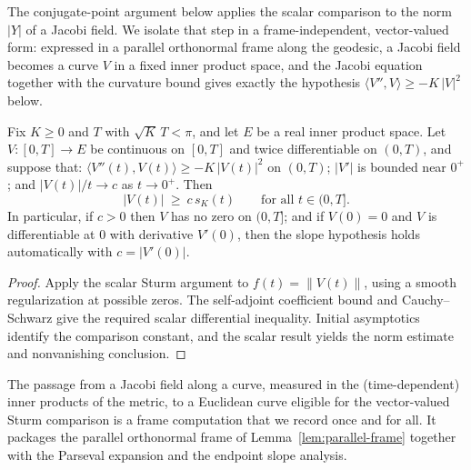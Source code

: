 The conjugate-point argument below applies the scalar comparison to
the norm $|Y|$ of a Jacobi field. We isolate that step in a
frame-independent, vector-valued form: expressed in a parallel
orthonormal frame along the geodesic, a Jacobi field becomes a curve
$V$ in a fixed inner product space, and the Jacobi equation together
with the curvature bound gives exactly the hypothesis
$\langle V'',V\rangle\ge-K\,|V|^2$ below.

\begin{lemma}
\label{lem:vector-sturm-comparison}





Fix $K\ge0$ and $T$ with $\sqrt K\,T<\pi$, and let $E$ be a real
inner product space. Let $V\colon[0,T]\to E$ be continuous on
$[0,T]$ and twice differentiable on $(0,T)$, and suppose that:
$\langle V''(t),V(t)\rangle\ge-K\,|V(t)|^2$ on $(0,T)$; $|V'|$ is
bounded near $0^+$; and $|V(t)|/t\to c$ as $t\to0^+$. Then
$$|V(t)|\ \ge\ c\,s_K(t)\qquad\text{for all }t\in(0,T].$$
In particular, if $c>0$ then $V$ has no zero on $(0,T]$; and if
$V(0)=0$ and $V$ is differentiable at $0$ with derivative $V'(0)$,
then the slope hypothesis holds automatically with $c=|V'(0)|$.
\end{lemma}

\begin{proof}
\sketch
{}

Apply the scalar Sturm argument to $f(t)=\|V(t)\|$, using a smooth regularization at possible zeros. The self-adjoint coefficient bound and Cauchy--Schwarz give the required scalar differential inequality. Initial asymptotics identify the comparison constant, and the scalar result yields the norm estimate and nonvanishing conclusion.
\end{proof}

The passage from a Jacobi field along a curve, measured in the
(time-dependent) inner products of the metric, to a Euclidean curve
eligible for the vector-valued Sturm comparison is a frame computation
that we record once and for all. It packages the parallel orthonormal
frame of Lemma~\ref{lem:parallel-frame} together with the Parseval
expansion and the endpoint slope analysis.


